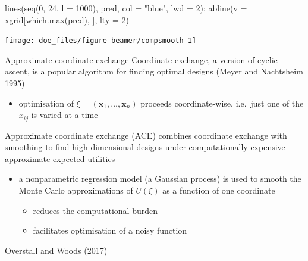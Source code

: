 \documentclass[
  ignorenonframetext,
]{beamer}
\newenvironment{Shaded}{\begin{snugshade}}{\end{snugshade}}
\newcommand{\AttributeTok}[1]{\textcolor[rgb]{0.77,0.63,0.00}{#1}}
\newcommand{\DecValTok}[1]{\textcolor[rgb]{0.00,0.00,0.81}{#1}}
\newcommand{\FunctionTok}[1]{\textcolor[rgb]{0.00,0.00,0.00}{#1}}
\newcommand{\NormalTok}[1]{#1}
\newcommand{\StringTok}[1]{\textcolor[rgb]{0.31,0.60,0.02}{#1}}
\providecommand{\tightlist}{%
  \setlength{\itemsep}{0pt}\setlength{\parskip}{0pt}}
\begin{document}
\begin{frame}[fragile]{}
\begin{Shaded}
\begin{Highlighting}[]
\FunctionTok{lines}\NormalTok{(}\FunctionTok{seq}\NormalTok{(}\DecValTok{0}\NormalTok{, }\DecValTok{24}\NormalTok{, }\AttributeTok{l =} \DecValTok{1000}\NormalTok{), pred, }\AttributeTok{col =} \StringTok{"blue"}\NormalTok{, }\AttributeTok{lwd =} \DecValTok{2}\NormalTok{); }\FunctionTok{abline}\NormalTok{(}\AttributeTok{v =}\NormalTok{ xgrid[}\FunctionTok{which.max}\NormalTok{(pred), ], }\AttributeTok{lty =} \DecValTok{2}\NormalTok{)}
\end{Highlighting}
\end{Shaded}

\begin{center}\texttt{[image: doe\_files/figure-beamer/compsmooth-1]} \end{center}
\end{frame}

\begin{frame}{Approximate coordinate exchange}
\protect\hypertarget{approximate-coordinate-exchange}{}
Coordinate exchange, a version of cyclic ascent, is a popular algorithm
for finding optimal designs (Meyer and Nachtsheim 1995)

\begin{itemize}
\tightlist
\item
  optimisation of \(\xi = (\boldsymbol{x}_1,\ldots,\boldsymbol{x}_n)\)
  proceeds coordinate-wise, i.e.~just one of the \(x_{ij}\) is varied at
  a time
\end{itemize}

Approximate coordinate exchange (ACE) combines coordinate exchange with
smoothing to find high-dimensional designs under computationally
expensive approximate expected utilities

\begin{itemize}
\tightlist
\item
  a nonparametric regression model (a Gaussian process) is used to
  smooth the Monte Carlo approximations of \(U(\xi)\) as a function of
  one coordinate

  \begin{itemize}
  \tightlist
  \item
    reduces the computational burden
  \item
    facilitates optimisation of a noisy function
  \end{itemize}
\end{itemize}

Overstall and Woods (2017)
\end{frame}
\end{document}
